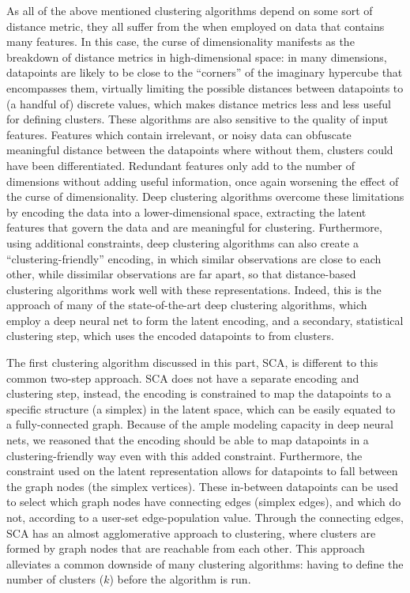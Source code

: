 	As all of the above mentioned clustering algorithms depend on some sort of distance metric, they all suffer from the  when employed on data that contains many features.
	In this case, the curse of dimensionality manifests as the breakdown of distance metrics in high-dimensional space: in many dimensions, datapoints are likely to be close to the ``corners'' of the imaginary hypercube that encompasses them, virtually limiting the possible distances between datapoints to (a handful of) discrete values, which makes distance metrics less and less useful for defining clusters.
	These algorithms are also sensitive to the quality of input features.
	Features which contain irrelevant, or noisy data can obfuscate meaningful distance between the datapoints where without them, clusters could have been differentiated.
	Redundant features only add to the number of dimensions without adding useful information, once again worsening the effect of the curse of dimensionality.	
	Deep clustering algorithms overcome these limitations by encoding the data into a lower-dimensional space, extracting the latent features that govern the data and are meaningful for clustering.
	Furthermore, using additional constraints, deep clustering algorithms can also create a ``clustering-friendly'' encoding, in which similar observations are close to each other, while dissimilar observations are far apart, so that distance-based clustering algorithms work well with these representations.
	Indeed, this is the approach of many of the state-of-the-art deep clustering algorithms, which employ a deep neural net to form the latent encoding, and a secondary, statistical clustering step, which uses the encoded datapoints to from clusters.
	
	The first clustering algorithm discussed in this part, \ac{SCA}, is different to this common two-step approach.
	\ac{SCA} does not have a separate encoding and clustering step, instead, the encoding is constrained to map the datapoints to a specific structure (a simplex) in the latent space, which can be easily equated to a fully-connected graph.
	Because of the ample modeling capacity in deep neural nets, we reasoned that the encoding should be able to map datapoints in a clustering-friendly way even with this added constraint.
	Furthermore, the constraint used on the latent representation allows for datapoints to fall between the graph nodes (the simplex vertices).
	These in-between datapoints can be used to select which graph nodes have connecting edges (simplex edges), and which do not, according to a user-set edge-population value.
	Through the connecting edges, \ac{SCA} has an almost agglomerative approach to clustering, where clusters are formed by graph nodes that are reachable from each other.
	This approach alleviates a common downside of many clustering algorithms: having to define the number of clusters ($k$) before the algorithm is run.
	
